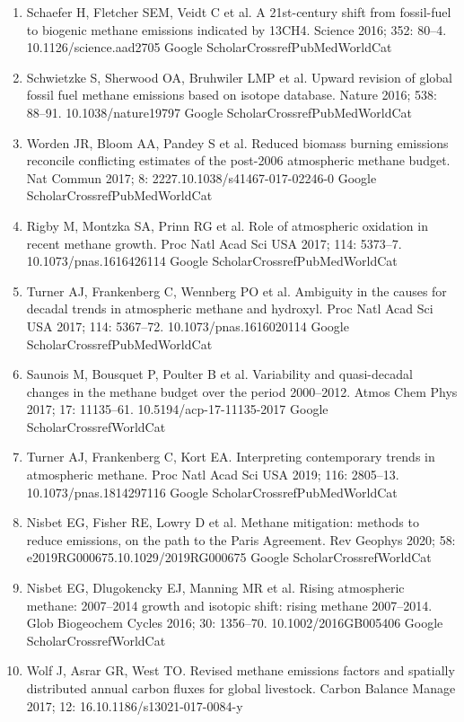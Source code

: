 \documentclass[a4paper,12pt]{article}
\begin{document}
{\begin{thebibliography}{}
\begin{enumerate}
    Google ScholarCrossrefWorldCat 
    \item	Schaefer H, Fletcher SEM, Veidt C et al.  A 21st-century shift from fossil-fuel to biogenic methane emissions indicated by 13CH4. Science 2016; 352: 80–4. 10.1126/science.aad2705
    Google ScholarCrossrefPubMedWorldCat 
    \item	Schwietzke S, Sherwood OA, Bruhwiler LMP et al.  Upward revision of global fossil fuel methane emissions based on isotope database. Nature 2016; 538: 88–91. 10.1038/nature19797
    Google ScholarCrossrefPubMedWorldCat 
    \item	Worden JR, Bloom AA, Pandey S et al.  Reduced biomass burning emissions reconcile conflicting estimates of the post-2006 atmospheric methane budget. Nat Commun 2017; 8: 2227.10.1038/s41467-017-02246-0
    Google ScholarCrossrefPubMedWorldCat 
    \item	Rigby M, Montzka SA, Prinn RG et al.  Role of atmospheric oxidation in recent methane growth. Proc Natl Acad Sci USA 2017; 114: 5373–7. 10.1073/pnas.1616426114
    Google ScholarCrossrefPubMedWorldCat 
    \item	Turner AJ, Frankenberg C, Wennberg PO et al.  Ambiguity in the causes for decadal trends in atmospheric methane and hydroxyl. Proc Natl Acad Sci USA 2017; 114: 5367–72. 10.1073/pnas.1616020114
    Google ScholarCrossrefPubMedWorldCat 
    \item	Saunois M, Bousquet P, Poulter B et al.  Variability and quasi-decadal changes in the methane budget over the period 2000–2012. Atmos Chem Phys 2017; 17: 11135–61. 10.5194/acp-17-11135-2017
    Google ScholarCrossrefWorldCat 
    \item	Turner AJ, Frankenberg C, Kort EA. Interpreting contemporary trends in atmospheric methane. Proc Natl Acad Sci USA 2019; 116: 2805–13. 10.1073/pnas.1814297116
    Google ScholarCrossrefPubMedWorldCat 
    \item	Nisbet EG, Fisher RE, Lowry D et al.  Methane mitigation: methods to reduce emissions, on the path to the Paris Agreement. Rev Geophys 2020; 58: e2019RG000675.10.1029/2019RG000675
    Google ScholarCrossrefWorldCat 
    \item	Nisbet EG, Dlugokencky EJ, Manning MR et al.  Rising atmospheric methane: 2007–2014 growth and isotopic shift: rising methane 2007–2014. Glob Biogeochem Cycles 2016; 30: 1356–70. 10.1002/2016GB005406
    Google ScholarCrossrefWorldCat 
    \item	Wolf J, Asrar GR, West TO. Revised methane emissions factors and spatially distributed annual carbon fluxes for global livestock. Carbon Balance Manage 2017; 12: 16.10.1186/s13021-017-0084-y

\end{enumerate}
\end{thebibliography}}
\end{document}
